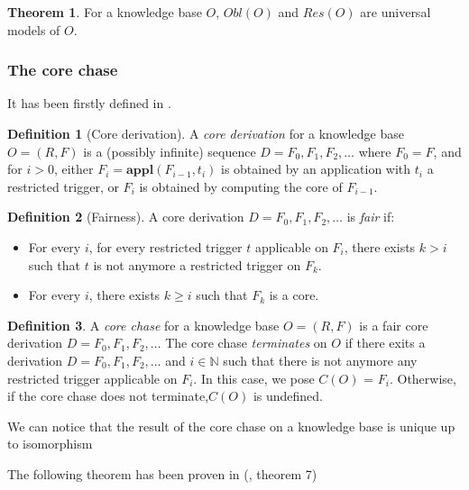 \documentclass{article}
\theoremstyle{definition}
\newtheorem{definition}{Definition}[section]
\newtheorem{theorem}{Theorem}[section]
\theoremstyle{remark}
\def \N {\mathbb N}
\newcommand{\Appl}{\textbf{appl}}
\begin{document}
\begin{theorem}
For a knowledge base $O$, $\textit{Obl}(O)$ and $\textit{Res}(O)$ are universal models of $O$.
\end{theorem}



\subsubsection{The core chase}

It has been firstly defined in \cite{core_chase}.

\begin{definition}[Core derivation]
A \emph{core derivation} for a knowledge base $O = (R,F)$ is a (possibly infinite) sequence $D = F_0, F_1, F_2, \ldots$ where $F_0 = F$, and for $i >0$, either $F_{i}= \Appl(F_{i-1},t_i)$ is obtained by an application with $t_i$ a restricted trigger, or $F_i$ is obtained by computing the core of $F_{i-1}$. 
\end{definition} 

\begin{definition}[Fairness]
A core derivation $D=F_0,F_1,F_2,\ldots$ is \emph{fair} if:
\begin{itemize}
\item For every $i$, for every restricted trigger $t$ applicable on $F_i$, there exists $k > i$ such that $t$ is not anymore a restricted trigger on $F_k$.
\item For every $i$, there exists $k \geq i$ such that $F_k$ is a core.

\end{itemize}
\end{definition}

\begin{definition}
A \emph{core chase} for a knowledge base $O= (R,F)$ is a fair core derivation $D=F_0,F_1,F_2,\ldots$ The core chase \emph{terminates} on $O$ if there exits a derivation $D=F_0,F_1,F_2,\ldots$ and $i \in \N$ such that there is not anymore any restricted trigger applicable on $F_i$. In this case, we pose \emph{$\textit{C}(O)$} = $F_i$.
Otherwise, if the core chase does not terminate,$\textit{C}(O)$ is undefined.
\end{definition}

We can notice that the result of the core chase on a knowledge base is unique up to isomorphism

The following theorem has been proven in (\cite{core_chase}, theorem 7)
\end{document}
